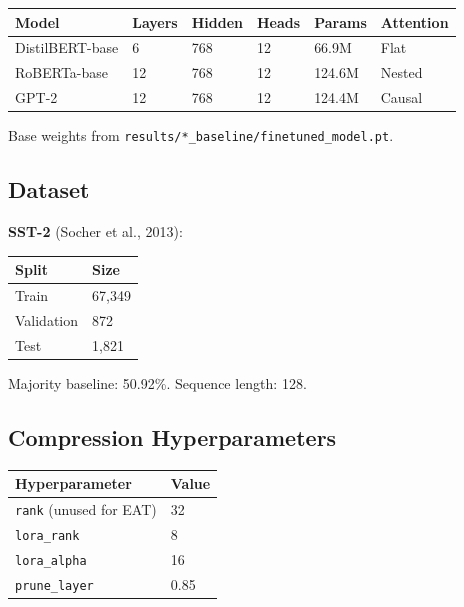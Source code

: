 \begin{table}[H]
\centering
\small
\begin{tabular}{llllll}
\toprule
\textbf{Model} & \textbf{Layers} & \textbf{Hidden} & \textbf{Heads} & \textbf{Params} & \textbf{Attention} \\
\midrule
DistilBERT-base & 6 & 768 & 12 & 66.9M & Flat \\
RoBERTa-base & 12 & 768 & 12 & 124.6M & Nested \\
GPT-2 & 12 & 768 & 12 & 124.4M & Causal \\
\bottomrule
\end{tabular}
\end{table}

Base weights from \texttt{results/*\_baseline/finetuned\_model.pt}.

\subsection{Dataset}

\textbf{SST-2} (Socher et al., 2013):

\begin{table}[H]
\centering
\small
\begin{tabular}{ll}
\toprule
\textbf{Split} & \textbf{Size} \\
\midrule
Train & 67,349 \\
Validation & 872 \\
Test & 1,821 \\
\bottomrule
\end{tabular}
\end{table}

Majority baseline: 50.92\%. Sequence length: 128.

\subsection{Compression Hyperparameters}

\begin{table}[H]
\centering
\small
\begin{tabular}{ll}
\toprule
\textbf{Hyperparameter} & \textbf{Value} \\
\midrule
\texttt{rank} (unused for EAT) & 32 \\
\texttt{lora\_rank} & 8 \\
\texttt{lora\_alpha} & 16 \\
\texttt{prune\_layer} & 0.85 \\
\bottomrule
\end{tabular}
\end{table}

